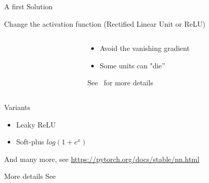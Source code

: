 \begin{frame}{A first Solution}
  \begin{block}{Change the activation function (Rectified Linear Unit or
      ReLU)}
    \begin{columns}
      \begin{column}{0.4\textwidth}
      \end{column}
      \begin{column}{0.6\textwidth}
        \begin{itemize}
        \item Avoid the vanishing gradient
        \item  Some units can "die''
        \end{itemize}
        See~\cite{Glorot11Rectifier} for more details
      \end{column}
    \end{columns}
  \end{block}
  \begin{block}{Variants}
    \begin{itemize}
    \item Leaky ReLU~\cite{Maas13lrelu}
    \item Soft-plus $log(1+e^x)$
    \end{itemize}
    And many more, see \url{https://pytorch.org/docs/stable/nn.html}
  \end{block}
  \begin{block}{More details}
    See~\cite{Hochreiter01Gradient,Glorot10Understanding,Lecun12Efficient} 
  \end{block}
\end{frame}


